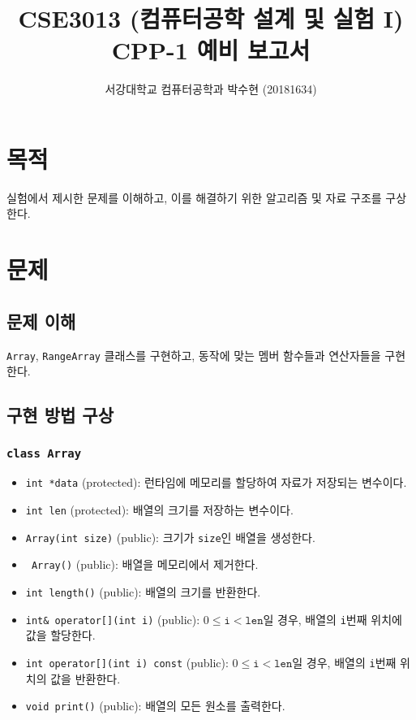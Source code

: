 \documentclass[runningheads]{../../../llncs}
\begin{document}
\title{CSE3013 (컴퓨터공학 설계 및 실험 I) \space \newline CPP-1 예비 보고서}
\author{서강대학교 컴퓨터공학과 박수현 (20181634)}
\maketitle

\section{목적}
실험에서 제시한 문제를 이해하고, 이를 해결하기 위한 알고리즘 및 자료 구조를 구상한다.

\section{문제}

\subsection{문제 이해}
\texttt{Array}, \texttt{RangeArray} 클래스를 구현하고, 동작에 맞는 멤버 함수들과 연산자들을 구현한다.

\subsection{구현 방법 구상}

\subsubsection{\texttt{class Array}}

\begin{itemize}
	\item \texttt{int *data} (protected): 런타임에 메모리를 할당하여 자료가 저장되는 변수이다.
	\item \texttt{int len} (protected): 배열의 크기를 저장하는 변수이다.
	\item \texttt{Array(int size)} (public): 크기가 \texttt{size}인 배열을 생성한다.
	\item \texttt{~Array()} (public): 배열을 메모리에서 제거한다.
	\item \texttt{int length()} (public): 배열의 크기를 반환한다.
	\item \texttt{int& operator[](int i)} (public): $0 \leq \texttt{i} < \texttt{len}$일 경우, 배열의 \texttt{i}번째 위치에 값을 할당한다.
	\item \texttt{int operator[](int i) const} (public): $0 \leq \texttt{i} < \texttt{len}$일 경우, 배열의 \texttt{i}번째 위치의 값을 반환한다.
	\item \texttt{void print()} (public): 배열의 모든 원소를 출력한다.
\end{itemize}
\end{document}
